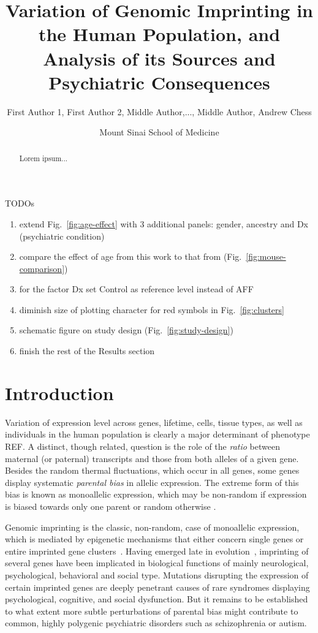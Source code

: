 \documentclass[letterpaper]{article}
\title{Variation of Genomic Imprinting in the Human Population,
and Analysis of its Sources and Psychiatric Consequences}
\author{First Author 1, First Author 2, Middle Author,..., Middle Author, Andrew
Chess}
\date{Mount Sinai School of Medicine}
\begin{document}
\maketitle

TODOs
\begin{enumerate}
\item extend Fig.~\ref{fig:age-effect} with 3 additional panels: gender,
ancestry and Dx (psychiatric condition)
\item compare the effect of age from this work to that from
\cite{Perez2015} (Fig.~\ref{fig:mouse-comparison})
\item for the factor Dx set Control as reference level instead of AFF
\item diminish size of plotting character for red symbols in
Fig.~\ref{fig:clusters} 
\item schematic figure on study design (Fig.~\ref{fig:study-design}) 
\item finish the rest of the Results section
\end{enumerate}

\newpage

\maketitle

\begin{abstract}
Lorem ipsum...
\end{abstract}

\section{Introduction}

Variation of expression level across genes, lifetime, cells, tissue types, as
well as individuals in the human population is clearly a major determinant of
phenotype REF.  A distinct, though related, question is the role of the
\emph{ratio} between maternal (or paternal) transcripts and those from both
alleles of a given gene.  Besides the random thermal fluctuations, which occur
in all genes, some genes display systematic \emph{parental bias} in allelic
expression.  The extreme form of this bias is known as monoallelic expression,
which may be non-random if expression is biased towards only one parent or
random otherwise \cite{Chess2012}.

Genomic imprinting is the classic, non-random, case of monoallelic expression,
which is mediated by epigenetic mechanisms that either concern single genes or
entire imprinted gene clusters~\cite{Peters2014,Plasschaert2014}.  Having
emerged late in evolution~\cite{Tucci2016}, imprinting of several genes have
been implicated in biological functions of mainly neurological, psychological,
behavioral and social type.  Mutations disrupting the expression of certain
imprinted genes are deeply penetrant causes of rare syndromes displaying
psychological, cognitive, and social dysfunction.  But it remains to be
established to what extent more subtle perturbations of parental bias might
contribute to common, highly polygenic psychiatric disorders such as
schizophrenia or autism.
\end{document}
